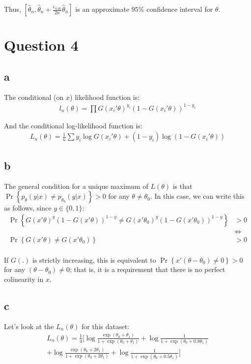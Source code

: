 \documentclass[12pt]{paper}
\begin{document}
Thus, $[\hat{\theta}_n,\hat{\theta}_n+\frac{e_{0.95}}{2n}\hat{\theta}_n]$ is an approximate $95\%$ confidence interval for $\theta$.

\section*{Question 4}

\subsection*{a}

The conditional (on $x$) likelihood function is:
\begin{align*}
l_n(\theta)=\prod{G(x_i'\theta)^{y_i} (1-G(x_i'\theta))^{1-y_i}}
\end{align*}

And the conditional log-likelihood function is:
\begin{align*}
L_n(\theta)=\frac{1}{n}\sum{y_i\log{G(x_i'\theta)} + (1-y_i)\log{(1-G(x_i'\theta))}}
\end{align*}

\subsection*{b}

The general condition for a unique maximum of $L(\theta)$ is that $\Pr\left\{p_\theta(y|x)\ne p_{\theta_0}(y|x)\right\}>0$ for any $\theta\ne \theta_0$. In this case, we can write this as follows, since $y\in\{0,1\}$:
\begin{align*}
\Pr\left\{G(x'\theta)^{y} (1-G(x'\theta))^{1-y}\ne G(x'\theta_0)^{y} (1-G(x'\theta_0))^{1-y} \right\}&>0 \\
&\Longleftrightarrow\\
\Pr\left\{G(x'\theta)\ne G(x'\theta_0)\right\}&>0 \\
\end{align*}

If $G(.)$ is strictly increasing, this is equivalent to $\Pr\left\{x'(\theta-\theta_0)\ne 0\right\}>0$ for any $(\theta-\theta_0)\ne0$; that is, it is a requirement that there is no perfect colinearity in $x$. 

\subsection*{c}

Let's look at the $L_n(\theta)$ for this dataset:
\begin{align*}
L_n(\theta)=\frac{1}{4}\Big[\log{\frac{\exp(\theta_0+\theta_1)}{1+\exp(\theta_0+\theta_1)}}+\log{\frac{1}{1+\exp(\theta_0+0.8\theta_1)}}\\
+\log{\frac{\exp(\theta_0+2\theta_1)}{1+\exp(\theta_0+2\theta_1)}}+\log{\frac{1}{1+\exp(\theta_0+0.5\theta_1)}}\Big]\\
\end{align*}
\end{document}
